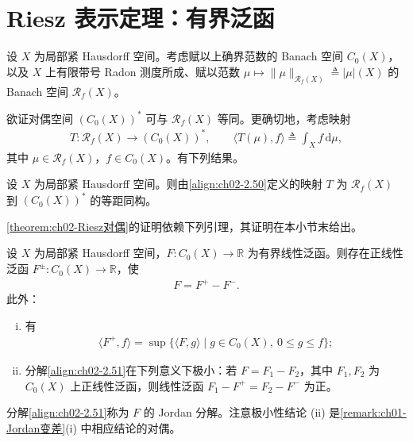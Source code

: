 \documentclass[../../main.tex]{subfiles}%
\begin{document}
\section{Riesz 表示定理：有界泛函}\label{section:ch02-Riesz有界泛函}

设 $X$ 为局部紧 Hausdorff 空间。考虑赋以上确界范数的 Banach 空间 $C_0(X)$，以及 $X$ 上有限带号 Radon 测度所成、赋以范数 $\mu\mapsto\|\mu\|_{\mathscr R_f(X)}\triangleq |\mu|(X)$ 的 Banach 空间 $\mathscr R_f(X)$。

欲证对偶空间 $(C_0(X))^*$ 可与 $\mathscr R_f(X)$ 等同。更确切地，考虑映射
\begin{align}
T:\mathscr R_f(X)\to(C_0(X))^*,\qquad\langle T(\mu),f\rangle\triangleq \int_X f\,\mathrm{d}\mu, \label{align:ch02-2.50}
\end{align}
其中 $\mu\in\mathscr R_f(X)$，$f\in C_0(X)$。有下列结果。

\begin{theorem}\label{theorem:ch02-Riesz对偶}
设 $X$ 为局部紧 Hausdorff 空间。则由\eqref{align:ch02-2.50}定义的映射 $T$ 为 $\mathscr R_f(X)$ 到 $(C_0(X))^*$ 的等距同构。
\end{theorem}

\cref{theorem:ch02-Riesz对偶}的证明依赖下列引理，其证明在本小节末给出。

\begin{lemma}\label{lemma:ch02-Jordan分解}
设 $X$ 为局部紧 Hausdorff 空间，$F:C_0(X)\to\mathbb R$ 为有界线性泛函。则存在正线性泛函 $F^\pm:C_0(X)\to\mathbb R$，使
\begin{align}
F=F^+-F^-. \label{align:ch02-2.51}
\end{align}
此外：
\begin{enumerate}[(i)]
\item 有
\begin{align}
\langle F^+,f\rangle=\sup\{\langle F,g\rangle\mid g\in C_0(X),\ 0\leqslant g\leqslant f\}; \label{align:ch02-2.52}
\end{align}
\item 分解\eqref{align:ch02-2.51}在下列意义下极小：若 $F=F_1-F_2$，其中 $F_1,F_2$ 为 $C_0(X)$ 上正线性泛函，则线性泛函 $F_1-F^+=F_2-F^-$ 为正。
\end{enumerate}
\end{lemma}

\begin{remark}\label{remark:ch02-Jordan分解名}
分解\eqref{align:ch02-2.51}称为 $F$ 的 Jordan 分解。注意极小性结论 (ii) 是\cref{remark:ch01-Jordan变差}(i) 中相应结论的对偶。
\end{remark}
\end{document}

